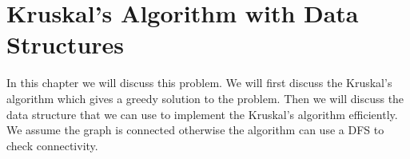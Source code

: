 \chapter{Kruskal's Algorithm with Data Structures}
\begin{algoprob}
\end{algoprob}
In this chapter we will discuss this problem. We will first discuss the Kruskal's algorithm which gives a greedy solution to the problem. Then we will discuss the data structure that we can use to implement the Kruskal's algorithm efficiently. We assume the graph is connected otherwise the algorithm can use a \textsc{DFS} to check connectivity.

